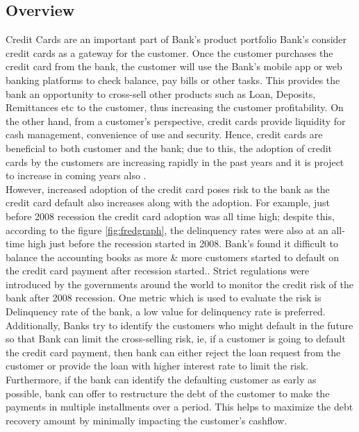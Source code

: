 \documentclass[twoside,11pt,a4paper]{article}
\begin{document}
\subsection{Overview}
Credit Cards are an important part of Bank's product portfolio Bank's consider credit cards as a gateway for the customer. Once the customer purchases the credit card from the bank, the customer will use the Bank's mobile app or web banking platforms to check balance, pay bills or other tasks. This provides the bank an opportunity to cross-sell other products such as Loan, Deposits, Remittances etc to the customer, thus increasing the customer profitability. On the other hand, from a customer's perspective, credit cards provide liquidity for cash management, convenience of use and security. Hence, credit cards are beneficial to both customer and the bank; due to this, the adoption of credit cards by the customers are increasing rapidly in the past years and it is project to increase in coming years also \citep{global2022cardpayments}.\\

However, increased adoption of the credit card poses risk to the bank as the credit card default also increases along with the adoption. For example, just before 2008 recession the credit card adoption was all time high; despite this, according to the  figure \ref{fig:fredgraph}, the delinquency rates were also at an all-time high just before the recession started in 2008. Bank's found it difficult to balance the accounting books as more \& more customers started to default on the credit card payment after recession started.. Strict regulations were introduced by the governments around the world to monitor the credit risk of the bank after 2008 recession. One metric which is used to evaluate the risk is Delinquency rate of the bank, a low value for delinquency rate is preferred.\\

Additionally, Banks try to identify the customers who might default in the future so that Bank can limit the cross-selling risk, ie, if a customer is going to default the credit card payment, then bank can either reject the loan request from the customer or provide the loan with higher interest rate to limit the risk. Furthermore, if the bank can identify the defaulting customer as early as possible, bank can offer to restructure the debt of the customer to make the payments in multiple installments over a period. This helps to maximize the debt recovery  amount by minimally impacting the customer's cashflow. 
\end{document}
